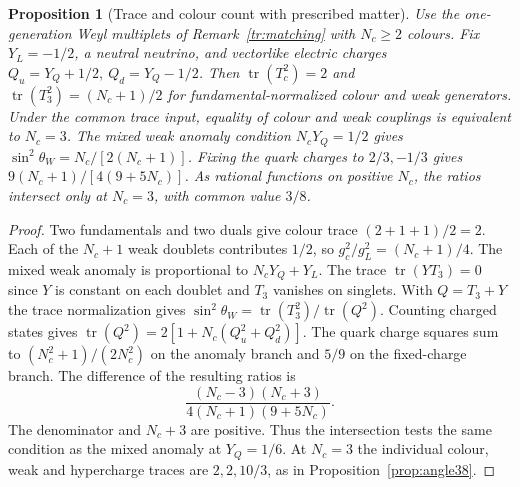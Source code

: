\documentclass[aps,pra,onecolumn,superscriptaddress,nofootinbib,10pt]{revtex4-2}
\newtheorem{proposition}[theorem]{Proposition}
\theoremstyle{definition}
\theoremstyle{remark}
\begin{document}
\begin{proposition}[Trace and colour count with prescribed matter]\label{tr:traces}
Use the one-generation Weyl multiplets of Remark~\ref{tr:matching}
with \(N_c\geq2\) colours. Fix \(Y_L=-1/2\), a neutral neutrino,
and vectorlike electric charges \(Q_u=Y_Q+1/2,\ Q_d=Y_Q-1/2\).
Then \(\operatorname{tr}(T_c^2)=2\) and
\(\operatorname{tr}(T_3^2)=(N_c+1)/2\) for fundamental-normalized
colour and weak generators. Under the common trace input, equality of
colour and weak couplings is equivalent to \(N_c=3\).
The mixed weak anomaly condition \(N_cY_Q=1/2\) gives
\(\sin^2\theta_W=N_c/[2(N_c+1)]\). Fixing the quark charges
to \(2/3,-1/3\) gives \(9(N_c+1)/[4(9+5N_c)]\).
As rational functions on positive \(N_c\), the ratios intersect
only at \(N_c=3\), with common value \(3/8\).
\end{proposition}
\begin{proof}
Two fundamentals and two duals give colour trace \((2+1+1)/2=2\).
Each of the \(N_c+1\) weak doublets contributes \(1/2\), so
\(g_c^2/g_L^2=(N_c+1)/4\). The mixed weak anomaly is proportional
to \(N_cY_Q+Y_L\). The trace \(\operatorname{tr}(YT_3)=0\)
since \(Y\) is constant on each doublet and \(T_3\) vanishes on
singlets. With \(Q=T_3+Y\) the trace normalization gives
\(\sin^2\theta_W=\operatorname{tr}(T_3^2)/\operatorname{tr}(Q^2)\).
Counting charged states gives
\(\operatorname{tr}(Q^2)=2[1+N_c(Q_u^2+Q_d^2)]\).
The quark charge squares sum to \((N_c^2+1)/(2N_c^2)\) on the
anomaly branch and \(5/9\) on the fixed-charge branch. The difference
of the resulting ratios is
\[
 \frac{(N_c-3)(N_c+3)}{4(N_c+1)(9+5N_c)}.
\]
The denominator and \(N_c+3\) are positive. Thus the intersection
tests the same condition as the mixed anomaly at \(Y_Q=1/6\).
At \(N_c=3\) the individual colour, weak and hypercharge traces are
\(2,2,10/3\), as in Proposition~\ref{prop:angle38}.
\end{proof}
\end{document}
